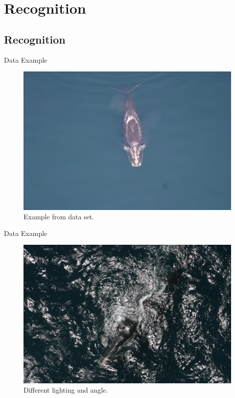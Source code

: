 \documentclass{beamer}
\begin{document}
\section{Recognition}
\subsection{Recognition}
\begin{frame}{Data Example}
\begin{figure}
\includegraphics[scale=.25]{example.png}
\caption{Example from data set.}
\end{figure}
\end{frame}

\begin{frame}{Data Example}
\begin{figure}
\includegraphics[scale=.25]{example2.png}
\caption{Different lighting and angle.}
\end{figure}
\end{frame}
\end{document}
